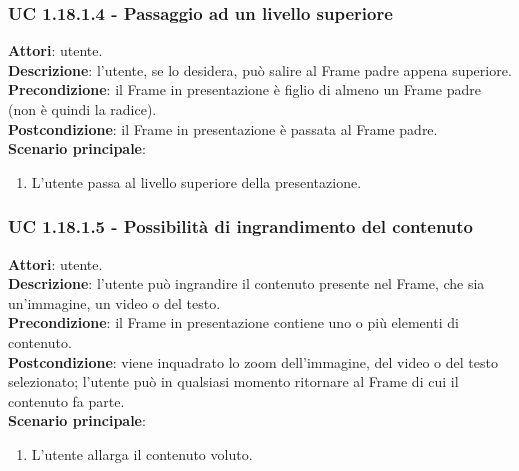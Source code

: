 	\subsubsection{UC 1.18.1.4 - Passaggio ad un livello superiore}{
		\label{uc1.18.1.4}
		\textbf{Attori}: utente. \\
		\textbf{Descrizione}: l'utente, se lo desidera, può salire al Frame padre appena superiore. \\
		\textbf{Precondizione}: il Frame in presentazione è figlio di almeno un Frame padre (non è quindi la radice).	\\
		\textbf{Postcondizione}: il Frame in presentazione è passata al Frame padre.\\
		\textbf{Scenario principale}:
		\begin{enumerate}
			\item L'utente passa al livello superiore della presentazione.
		\end{enumerate}
	}
	\subsubsection{UC 1.18.1.5 - Possibilità di ingrandimento del contenuto}{
		\label{uc1.18.1.18}
		\textbf{Attori}: utente. \\
		\textbf{Descrizione}: l'utente può ingrandire il contenuto presente nel Frame, che sia un'immagine, un video o del testo. \\
		\textbf{Precondizione}: il Frame in presentazione contiene uno o più elementi di contenuto.	\\
		\textbf{Postcondizione}: viene inquadrato lo zoom dell'immagine, del video o del testo selezionato; l'utente può in qualsiasi momento ritornare al Frame di cui il contenuto fa parte.\\
		\textbf{Scenario principale}:
		\begin{enumerate}
			\item L'utente allarga il contenuto voluto.
		\end{enumerate}
	}
